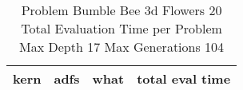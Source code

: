 \begin{table}[H]
\caption{Problem  Bumble Bee 3d  Flowers 20\\Total Evaluation Time per Problem \\ Max Depth 17 Max Generations 104\\}
\begin{center}
\scalebox{1.0} %
{
\begin{tabular}{lllr}
\hline
kern & adfs & what & total eval time \\
\hline


\end{tabular}
}
\end{center}
\end{table}

